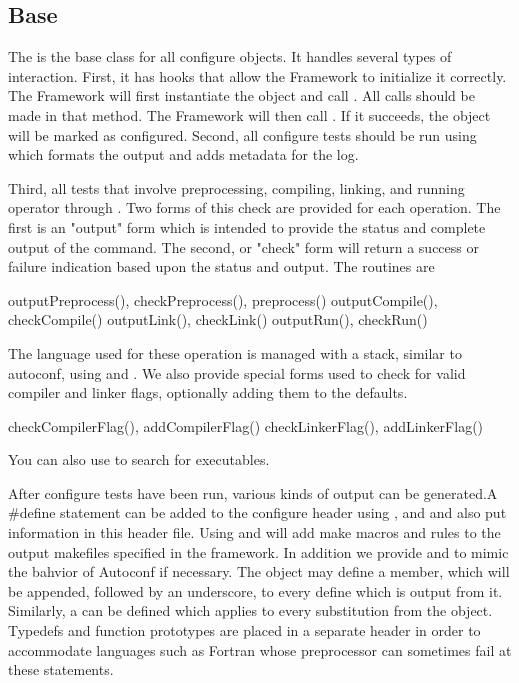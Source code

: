 {{{\subsection{Base}

The  is the base class for all configure objects. It handles several types of interaction. First, it has hooks that allow the Framework to initialize it correctly. The Framework will first instantiate the object and call . All  calls should be made in that method. The Framework will then call . If it succeeds, the object will be marked as configured. Second, all configure tests should be run using  which formats the output and adds metadata for the log.

Third, all tests that involve preprocessing, compiling, linking, and running operator through . Two forms of this check are provided for each operation. The first is an "output" form which is intended to provide the status and complete output of the command. The second, or "check" form will return a success or failure indication based upon the status and output. The routines are
\begin{bashlisting}
  outputPreprocess(), checkPreprocess(), preprocess()
  outputCompile(),    checkCompile()
  outputLink(),       checkLink()
  outputRun(),        checkRun()
\end{bashlisting}
The language used for these operation is managed with a stack, similar to autoconf, using  and . We also provide special forms used to check for valid compiler and linker flags, optionally adding them to the defaults.
\begin{bashlisting}
  checkCompilerFlag(), addCompilerFlag()
  checkLinkerFlag(),   addLinkerFlag()
\end{bashlisting}
You can also use  to search for executables.

After configure tests have been run, various kinds of output can be generated.A \#define statement can be added to the configure header using , and  and  also put information in this header file. Using  and  will add make macros and rules to the output makefiles specified in the framework. In addition we provide  and  to mimic the bahvior of Autoconf if necessary. The object may define a  member, which will be appended, followed by an underscore, to every define which is output from it. Similarly, a  can be defined which applies to every substitution from the object. Typedefs and function prototypes are placed in a separate header in order to accommodate languages such as Fortran whose preprocessor can sometimes fail at these statements.


}}}
